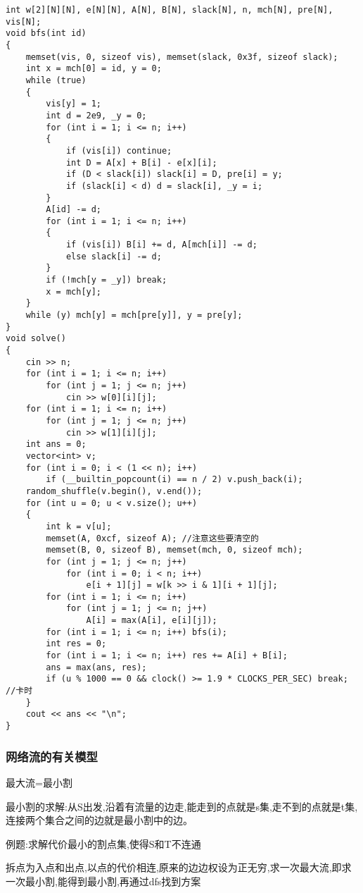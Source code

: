\documentclass[a4paper, fontset=none]{ctexart}
\begin{document}
\begin{verbatim}
int w[2][N][N], e[N][N], A[N], B[N], slack[N], n, mch[N], pre[N], vis[N];
void bfs(int id)
{
    memset(vis, 0, sizeof vis), memset(slack, 0x3f, sizeof slack);
    int x = mch[0] = id, y = 0;
    while (true)
    {
        vis[y] = 1;
        int d = 2e9, _y = 0;
        for (int i = 1; i <= n; i++)
        {
            if (vis[i]) continue;
            int D = A[x] + B[i] - e[x][i];
            if (D < slack[i]) slack[i] = D, pre[i] = y;
            if (slack[i] < d) d = slack[i], _y = i;
        }
        A[id] -= d;
        for (int i = 1; i <= n; i++)
        {
            if (vis[i]) B[i] += d, A[mch[i]] -= d;
            else slack[i] -= d;
        }
        if (!mch[y = _y]) break;
        x = mch[y];
    }
    while (y) mch[y] = mch[pre[y]], y = pre[y];
}
void solve()
{
    cin >> n;
    for (int i = 1; i <= n; i++)
        for (int j = 1; j <= n; j++)
            cin >> w[0][i][j];
    for (int i = 1; i <= n; i++)
        for (int j = 1; j <= n; j++)
            cin >> w[1][i][j];
    int ans = 0;
    vector<int> v;
    for (int i = 0; i < (1 << n); i++)
        if (__builtin_popcount(i) == n / 2) v.push_back(i);
    random_shuffle(v.begin(), v.end());
    for (int u = 0; u < v.size(); u++)
    {
        int k = v[u];
        memset(A, 0xcf, sizeof A); //注意这些要清空的
        memset(B, 0, sizeof B), memset(mch, 0, sizeof mch);
        for (int j = 1; j <= n; j++)
            for (int i = 0; i < n; i++)
                e[i + 1][j] = w[k >> i & 1][i + 1][j];
        for (int i = 1; i <= n; i++)
            for (int j = 1; j <= n; j++)
                A[i] = max(A[i], e[i][j]);
        for (int i = 1; i <= n; i++) bfs(i);
        int res = 0;
        for (int i = 1; i <= n; i++) res += A[i] + B[i];
        ans = max(ans, res);
        if (u % 1000 == 0 && clock() >= 1.9 * CLOCKS_PER_SEC) break; //卡时
    }
    cout << ans << "\n";
}
\end{verbatim}
\subsubsection{网络流的有关模型}

最大流=最小割

最小割的求解:从S出发,沿着有流量的边走,能走到的点就是s集,走不到的点就是t集,连接两个集合之间的边就是最小割中的边。

例题:求解代价最小的割点集,使得S和T不连通

拆点为入点和出点,以点的代价相连,原来的边边权设为正无穷,求一次最大流,即求一次最小割,能得到最小割,再通过dfs找到方案
\end{document}
